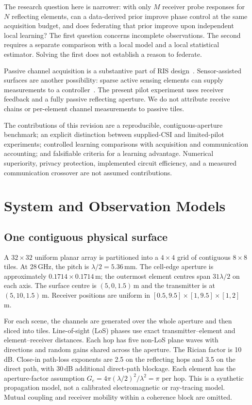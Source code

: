 \documentclass[journal]{IEEEtran}
\begin{document}
The research question here is narrower: with only $M$ receiver probe responses for $N$ reflecting elements, can a data-derived prior improve phase control at the same acquisition budget, and does federating that prior improve upon independent local learning? The first question concerns incomplete observations. The second requires a separate comparison with a local model and a local statistical estimator. Solving the first does not establish a reason to federate.

Passive channel acquisition is a substantive part of RIS design~\cite{zheng2022survey}. Sensor-assisted surfaces are another possibility: sparse active sensing elements can supply measurements to a controller~\cite{taha2019}. The present pilot experiment uses receiver feedback and a fully passive reflecting aperture. We do not attribute receive chains or per-element channel measurements to passive tiles.

The contributions of this revision are a reproducible, contiguous-aperture benchmark; an explicit distinction between supplied-CSI and limited-pilot experiments; controlled learning comparisons with acquisition and communication accounting; and falsifiable criteria for a learning advantage. Numerical superiority, privacy protection, implemented circuit efficiency, and a measured communication crossover are not assumed contributions.

\section{System and Observation Models}
\subsection{One contiguous physical surface}
A $32\times32$ uniform planar array is partitioned into a $4\times4$ grid of contiguous $8\times8$ tiles. At 28\,GHz, the pitch is $\lambda/2=5.36$\,mm. The cell-edge aperture is approximately $0.1714\times0.1714$\,m; the outermost element centres span $31\lambda/2$ on each axis. The surface centre is $(5,0,1.5)$\,m and the transmitter is at $(5,10,1.5)$\,m. Receiver positions are uniform in $[0.5,9.5]\times[1,9.5]\times[1,2]$\,m.

For each scene, the channels are generated over the whole aperture and then sliced into tiles. Line-of-sight (LoS) phases use exact transmitter--element and element--receiver distances. Each hop has five non-LoS plane waves with directions and random gains shared across the aperture. The Rician factor is 10\,dB. Close-in path-loss exponents are 2.5 on the reflecting hops and 3.5 on the direct path, with 30\,dB additional direct-path blockage. Each element has the aperture-factor assumption $G_e=4\pi(\lambda/2)^2/\lambda^2=\pi$ per hop. This is a synthetic propagation model, not a calibrated electromagnetic or ray-tracing model. Mutual coupling and receiver mobility within a coherence block are omitted.
\end{document}

